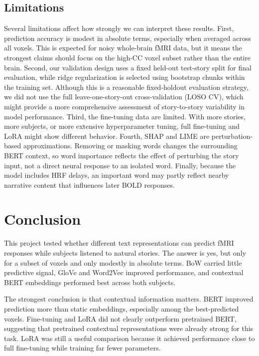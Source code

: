 \documentclass[11pt]{article}
\begin{document}
\subsection{Limitations}
Several limitations affect how strongly we can interpret these results. First, prediction accuracy is modest in absolute terms, especially when averaged across all voxels. This is expected for noisy whole-brain fMRI data, but it means the strongest claims should focus on the high-CC voxel subset rather than the entire brain. Second, our validation design uses a fixed held-out test-story split for final evaluation, while ridge regularization is selected using bootstrap chunks within the training set. Although this is a reasonable fixed-holdout evaluation strategy, we did not use the full leave-one-story-out cross-validation (LOSO CV), which might provide a more comprehensive assessment of story-to-story variability in model performance. Third, the fine-tuning data are limited. With more stories, more subjects, or more extensive hyperparameter tuning, full fine-tuning and LoRA might show different behavior. Fourth, SHAP and LIME are perturbation-based approximations. Removing or masking words changes the surrounding BERT context, so word importance reflects the effect of perturbing the story input, not a direct neural response to an isolated word. Finally, because the model includes HRF delays, an important word may partly reflect nearby narrative content that influences later BOLD responses.

\section{Conclusion}
This project tested whether different text representations can predict fMRI responses while subjects listened to natural stories. The answer is yes, but only for a subset of voxels and only modestly in absolute terms. BoW carried little predictive signal, GloVe and Word2Vec improved performance, and contextual BERT embeddings performed best across both subjects.

The strongest conclusion is that contextual information matters. BERT improved prediction more than static embeddings, especially among the best-predicted voxels. Fine-tuning and LoRA did not clearly outperform pretrained BERT, suggesting that pretrained contextual representations were already strong for this task. LoRA was still a useful comparison because it achieved performance close to full fine-tuning while training far fewer parameters.
\end{document}
